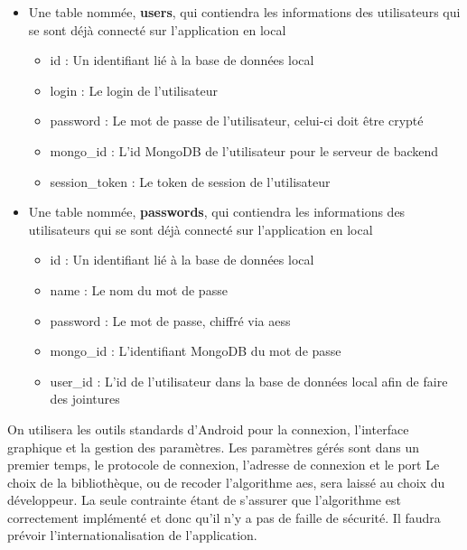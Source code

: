 \documentclass[12pt]{report}
\begin{document}
	\begin{itemize}
		\item Une table nommée, \textbf{users}, qui contiendra les informations des utilisateurs qui se sont déjà connecté sur l'application en local
		\begin{itemize}
			\item id : Un identifiant lié à la base de données local
			\item login : Le login de l'utilisateur
			\item password : Le mot de passe de l'utilisateur, celui-ci doit être crypté
			\item mongo\_id : L'id MongoDB de l'utilisateur pour le serveur de backend
			\item session\_token : Le token de session de l'utilisateur
		\end{itemize}
		\item Une table nommée, \textbf{passwords}, qui contiendra les informations des utilisateurs qui se sont déjà connecté sur l'application en local
		\begin{itemize}
			\item id : Un identifiant lié à la base de données local
			\item name : Le nom du mot de passe
			\item password : Le mot de passe, chiffré via \glspl{aes}
			\item mongo\_id : L'identifiant MongoDB du mot de passe
			\item user\_id : L'id de l'utilisateur dans la base de données local afin de faire des jointures
		\end{itemize}
	\end{itemize}
	On utilisera les outils standards d'Android pour la connexion, l'interface graphique et la gestion des paramètres.
	\newline Les paramètres gérés sont dans un premier temps, le protocole de connexion, l'adresse de connexion et le port
	\newline
	Le choix de la bibliothèque, ou de recoder l'algorithme \gls{aes}, sera laissé au choix du développeur. La seule contrainte étant de s'assurer que l'algorithme est correctement implémenté et donc qu'il n'y a pas de faille de sécurité.
	\newline
	Il faudra prévoir l'internationalisation de l'application.
	
	
\end{document}
